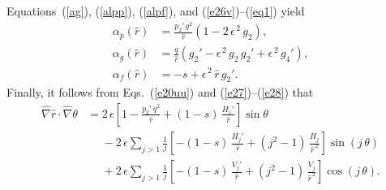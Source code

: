 \documentclass[12pt,prb,aps]{revtex4-1}
\begin{document}
Equations~(\ref{ag}), (\ref{alpp}), (\ref{alpf}), and (\ref{e26v})--(\ref{eq1}) yield\,\cite{tj}
\begin{align}
\alpha_p(\hat{r}) &= \frac{p_2'\,q^2}{\hat{r}}\left(1-2\,\epsilon^{\,2}\,g_2\right),\\[0.5ex]
\alpha_g(\hat{r}) &= \frac{q}{\hat{r}}\left(g_2' -\epsilon^{\,2}\,g_2\,g_2'+\epsilon^{\,2}\,g_4'\right),\\[0.5ex]
\alpha_f(\hat{r}) &= -s + \epsilon^{\,2}\,\hat{r}\,g_2'.
\end{align}
Finally, it follows from Eqs.~(\ref{e20uu}) and (\ref{e27})--(\ref{e28}) that
\begin{align}\label{e114}
\hat{\nabla}\hat{r}\cdot\hat{\nabla}\theta &= 2\,\epsilon\left[1-\frac{p_2'\,q^2}{\hat{r}} +(1-s)\,\frac{H_1'}{\hat{r}}\right]\sin\theta\nonumber\\[0.5ex]
&\phantom{=}-2\,\epsilon\sum_{j>1}\frac{1}{j}\left[-(1-s)\,\frac{H_j'}{\hat{r}} + (j^2-1)\,\frac{H_j}{\hat{r}^{\,2}}\right]\sin(j\,\theta)\nonumber\\[0.5ex]
&\phantom{=}+2\,\epsilon\sum_{j>1}\frac{1}{j}\left[-(1-s)\,\frac{V_j'}{\hat{r}} + (j^2-1)\,\frac{V_j}{\hat{r}^{\,2}}\right]\cos(j\,\theta).
\end{align}
\end{document}
